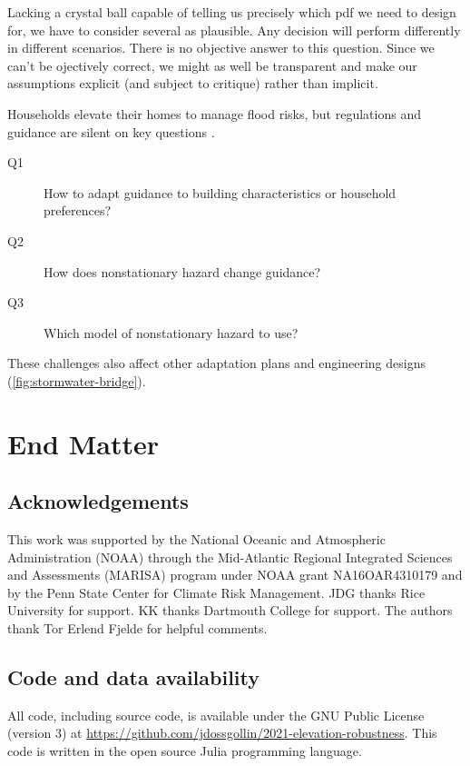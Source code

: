 \documentclass[12pt]{article}
\begin{document}
Lacking a crystal ball capable of telling us precisely which \gls{pdf} we need to design for, we have to consider several as plausible.
Any decision will perform differently in different scenarios.
There is no objective answer to this question.
Since we can't be ojectively correct, we might as well be transparent and make our assumptions explicit (and subject to critique) rather than implicit.

Households elevate their homes to manage flood risks, but regulations and guidance are silent on key questions \citep{zarekarizi_suboptimal:2020,xian_elevation:2017}.
\begin{description}
    \item[Q1] How to adapt guidance to building characteristics or household preferences?
    \item[Q2] How does nonstationary hazard change guidance?
    \item[Q3] Which model of nonstationary hazard to use?
\end{description}
These challenges also affect other adaptation plans and engineering designs (\cref{fig:stormwater-bridge}).

\section*{End Matter}

\subsection*{Acknowledgements}

This work was supported by the National Oceanic and Atmospheric Administration (NOAA) through the Mid-Atlantic Regional Integrated Sciences and Assessments (MARISA) program under NOAA grant NA16OAR4310179 and by the Penn State Center for Climate Risk Management.
JDG thanks Rice University for support.
KK thanks Dartmouth College for support.
The authors thank Tor Erlend Fjelde for helpful comments.

\subsection*{Code and data availability}

All code, including source code, is available under the GNU Public License (version 3) at \url{https://github.com/jdossgollin/2021-elevation-robustness}.
This code is written in the open source Julia programming language.
\end{document}

